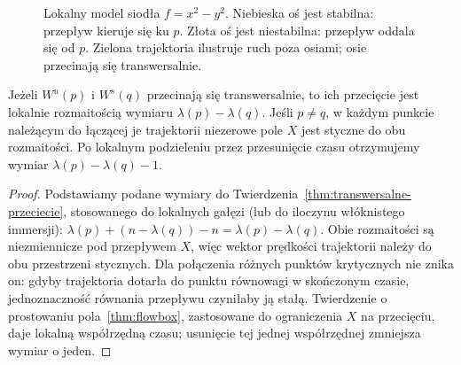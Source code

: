 \begin{figure}[htbp]
\centering
{}
\caption{Lokalny model siodła $f=x^2-y^2$.
Niebieska oś jest stabilna: przepływ kieruje się
ku $p$. Złota oś jest niestabilna: przepływ
oddala się od $p$. Zielona trajektoria ilustruje
ruch poza osiami; osie przecinają się transwersalnie.}
\label{fig:smale-siodlo}
\end{figure}

\begin{wniosek}
\label{cor:smale-wymiar}
Jeżeli $W^u(p)$ i $W^s(q)$ przecinają się
transwersalnie, to ich przecięcie jest lokalnie
rozmaitością wymiaru
$\lambda(p)-\lambda(q)$.
Jeśli $p\ne q$, w każdym punkcie należącym
do łączącej je trajektorii niezerowe pole
$X$ jest styczne do obu rozmaitości.
Po lokalnym podzieleniu przez przesunięcie
czasu otrzymujemy wymiar
$\lambda(p)-\lambda(q)-1$.
\end{wniosek}
\begin{proof}
Podstawiamy podane wymiary do
Twierdzenia~\ref{thm:transwersalne-przeciecie}, stosowanego
do lokalnych gałęzi (lub do iloczynu włóknistego immersji):
$\lambda(p)+(n-\lambda(q))-n
=\lambda(p)-\lambda(q)$.
Obie rozmaitości są niezmiennicze
pod przepływem $X$, więc wektor prędkości
trajektorii należy do obu przestrzeni
stycznych. Dla połączenia różnych
punktów krytycznych nie znika on:
gdyby trajektoria dotarła do punktu
równowagi w skończonym czasie,
jednoznaczność równania przepływu
czyniłaby ją stałą. Twierdzenie o prostowaniu
pola~\ref{thm:flowbox}, zastosowane do ograniczenia $X$
na przecięciu, daje lokalną współrzędną czasu; usunięcie tej jednej współrzędnej
zmniejsza wymiar o jeden.
\end{proof}

